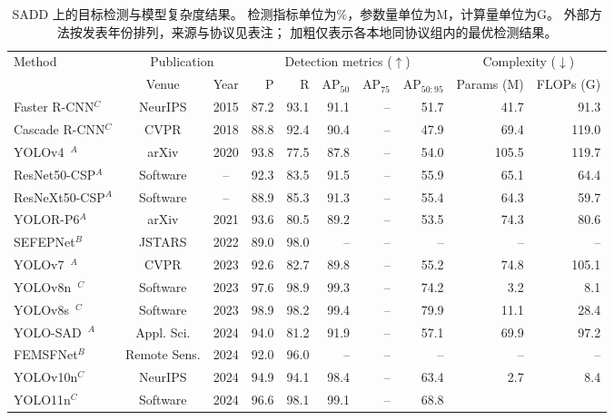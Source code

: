 \begin{table}[!t]
\centering
\scriptsize
\setlength{\tabcolsep}{2.8pt}
\renewcommand{\arraystretch}{1.08}
\caption{SADD 上的目标检测与模型复杂度结果。
检测指标单位为\%，参数量单位为M，计算量单位为G。
外部方法按发表年份排列，来源与协议见表注；
加粗仅表示各本地同协议组内的最优检测结果。}
\label{tab:sadd_detection_comparison}
\begin{tabular*}{\textwidth}{@{\extracolsep{\fill}}lccrrrrrrr}
\toprule
\multirow{2}{*}{Method}
& \multicolumn{2}{c}{Publication}
& \multicolumn{5}{c}{Detection metrics ($\uparrow$)}
& \multicolumn{2}{c}{Complexity ($\downarrow$)} \\
\cmidrule(lr){2-3}\cmidrule(lr){4-8}\cmidrule(lr){9-10}
& Venue & Year & P & R
& AP$_{50}$ & AP$_{75}$ & AP$_{50:95}$
& Params (M) & FLOPs (G) \\
\midrule
Faster R-CNN$^{C}$
& NeurIPS & 2015
& 87.2 & 93.1 & 91.1 & -- & 51.7
& 41.7 & 91.3 \\
Cascade R-CNN$^{C}$
& CVPR & 2018
& 88.8 & 92.4 & 90.4 & -- & 47.9
& 69.4 & 119.0 \\
YOLOv4~\cite{yolov42020}$^{A}$
& arXiv & 2020
& 93.8 & 77.5 & 87.8 & -- & 54.0
& 105.5 & 119.7 \\
ResNet50-CSP$^{A}$
& Software & --
& 92.3 & 83.5 & 91.5 & -- & 55.9
& 65.1 & 64.4 \\
ResNeXt50-CSP$^{A}$
& Software & --
& 88.9 & 85.3 & 91.3 & -- & 55.4
& 64.3 & 59.7 \\
YOLOR-P6$^{A}$
& arXiv & 2021
& 93.6 & 80.5 & 89.2 & -- & 53.5
& 74.3 & 80.6 \\
SEFEPNet$^{B}$
& JSTARS & 2022
& 89.0 & 98.0 & -- & -- & --
& -- & -- \\
YOLOv7~\cite{yolov72023}$^{A}$
& CVPR & 2023
& 92.6 & 82.7 & 89.8 & -- & 55.2
& 74.8 & 105.1 \\
YOLOv8n~\cite{yolov82023}$^{C}$
& Software & 2023
& 97.6 & 98.9 & 99.3 & -- & 74.2
& 3.2 & 8.1 \\
YOLOv8s~\cite{yolov82023}$^{C}$
& Software & 2023
& 98.9 & 98.2 & 99.4 & -- & 79.9
& 11.1 & 28.4 \\
YOLO-SAD~\cite{yolosad2024}$^{A}$
& Appl. Sci. & 2024
& 94.0 & 81.2 & 91.9 & -- & 57.1
& 69.9 & 97.2 \\
FEMSFNet$^{B}$
& Remote Sens. & 2024
& 92.0 & 96.0 & -- & -- & --
& -- & -- \\
YOLOv10n$^{C}$
& NeurIPS & 2024
& 94.9 & 94.1 & 98.4 & -- & 63.4
& 2.7 & 8.4 \\
YOLO11n$^{C}$
& Software & 2024
& 96.6 & 98.1 & 99.1 & -- & 68.8

\end{tabular*}
\end{table}
